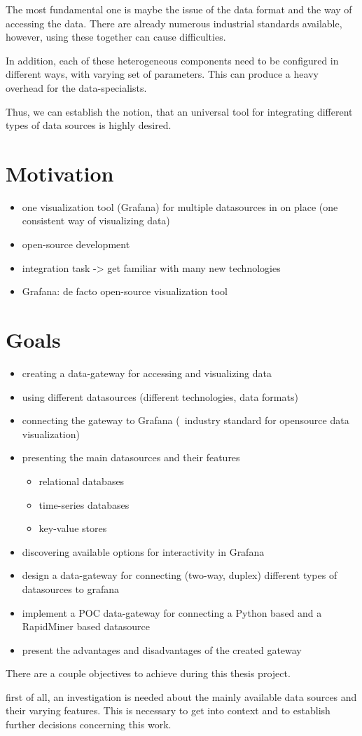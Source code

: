 The most fundamental one is maybe the issue of the data format and the way of accessing the data. There are already numerous industrial standards available, however, using these together can cause difficulties.

In addition, each of these heterogeneous components need to be configured in different ways, with varying set of parameters. This can produce a heavy overhead for the data-specialists.

Thus, we can establish the notion, that an universal tool for integrating different types of data sources is highly desired.

\section{Motivation}

\begin{itemize}
	\item one visualization tool (Grafana) for multiple datasources in on place (one consistent way of visualizing data)
	\item open-source development
	\item integration task -> get familiar with many new technologies
	\item Grafana: de facto open-source visualization tool
\end{itemize}

\section{Goals}

\begin{itemize}
	\item creating a data-gateway for accessing and visualizing data
	\item using different datasources (different technologies, data formats)
	\item connecting the gateway to Grafana (~industry standard for opensource data visualization)
	\item presenting the main datasources and their features
	\begin{itemize}
		\item relational databases
		\item time-series databases
		\item key-value stores
	\end{itemize}
	\item discovering available options for interactivity in Grafana
	\item design a data-gateway for connecting (two-way, duplex) different types of datasources to grafana
	\item implement a POC data-gateway for connecting a Python based and a RapidMiner based datasource
	\item present the advantages and disadvantages of the created gateway
\end{itemize}


There are a couple objectives to achieve during this thesis project.

first of all, an investigation is needed about the mainly available data sources and their varying features. This is necessary to get into context and to establish further decisions concerning this work.



